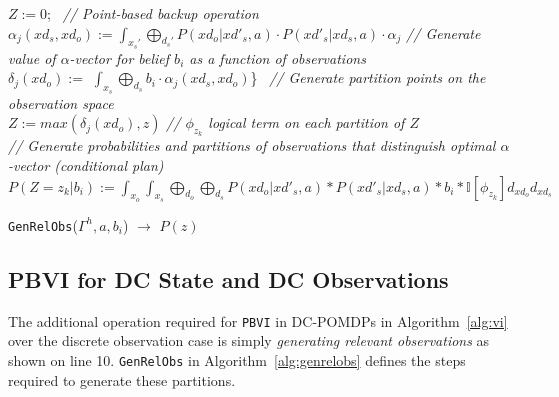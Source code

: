 \documentclass{article} %
\begin{document}
\incmargin{.5em}
\linesnumbered
\begin{algorithm}[t!]
\vspace{-.5mm}
\dontprintsemicolon
{}

\Begin
{
	$Z:=0$;\	
		{
		\emph{// Point-based backup operation}\\
    	$\alpha_j(xd_s,xd_o) := \int_{x_s'} \bigoplus_{d_s'} P(xd_{o}|xd'_{s},a) \cdot P(xd'_{s}| xd_{s},a)\cdot \alpha_j $\;
		}  
		{
		\emph{// Generate value of $\alpha$-vector for belief $b_i$ as a function of observations}\\
		$\delta_{j}(xd_o) := $ $\int_{x_{s}} \bigoplus_{d_s} b_i \cdot \alpha_j(xd_s,xd_o)$\}\ \;
		}
		{
		\emph{// Generate partition points on the observation space}\\
		$Z := max(\delta_j(xd_o),z)$\;
    	}
    	\emph{// $\phi_{z_k}$ logical term on each partition of $Z$}\\
    	\emph{// Generate probabilities and partitions of observations that distinguish optimal $\alpha$-vector (conditional plan)}\\
   		$P(Z=z_k|b_i) := \int_{x_o} \int_{x_s} \bigoplus_{d_o} \bigoplus_{d_s} P(xd_o|xd'_s,a)*P(xd'_s|xd_s,a)*b_i* \mathbb{I}[\phi_{z_k}] d_{xd_o} d_{xd_s}$ \;
    \Return{$P(z)$} \;
}
\caption{\footnotesize \texttt{GenRelObs}($\Gamma^h,a,b_i$) $\longrightarrow$ $P(z)$ }
\label{alg:genrelobs}
\vspace{-1mm}
\end{algorithm}
\decmargin{.5em}
\subsection{PBVI for DC State and DC Observations} 
\label{sec:cont_obs}

The additional operation required for \texttt{PBVI} in DC-POMDPs in
Algorithm~\ref{alg:vi} over the discrete observation case is simply
\emph{generating relevant observations} as shown on line 10.
\texttt{GenRelObs} in Algorithm~\ref{alg:genrelobs} defines the steps
required to generate these partitions.
\end{document}
